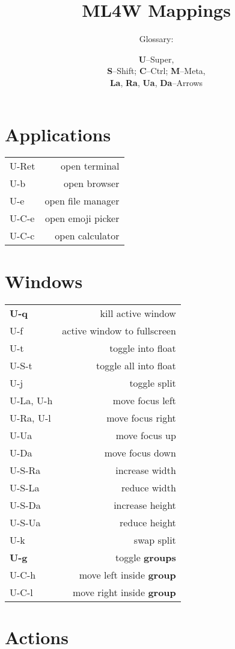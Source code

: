 \documentclass[
  ,landscape
  ,columns=4
]{cheatsheet}
\title{ML4W Mappings}
\author{Glossary:}
\date{
  \textbf{U}--Super,\\
  \textbf{S}--Shift; \textbf{C}--Ctrl; \textbf{M}--Meta,\\
  \textbf{La}, \textbf{Ra}, \textbf{Ua}, \textbf{Da}--Arrows
}
\begin{document}
\maketitle

\section{Applications}

\begin{tabular}{lr}
  U-Ret & open terminal \\
  U-b & open browser \\
  U-e & open file manager \\
  U-C-e & open emoji picker \\
  U-C-c & open calculator \\
\end{tabular}

\section{Windows}

\begin{tabular}{lr}
  \textbf{U-q} & kill active window \\
  U-f & active window to fullscreen \\
  U-t & toggle into float \\
  U-S-t & toggle all into float \\
  U-j & toggle split \\
  U-La, U-h & move focus left \\
  U-Ra, U-l & move focus right \\
  U-Ua & move focus up \\
  U-Da & move focus down \\
  U-S-Ra & increase width \\
  U-S-La & reduce width \\
  U-S-Da & increase height \\
  U-S-Ua & reduce height \\
  U-k & swap split \\
  \textbf{U-g} & toggle \textbf{groups} \\
  U-C-h & move left inside \textbf{group} \\
  U-C-l & move right inside \textbf{group} \\
\end{tabular}

\section{Actions}
\end{document}
